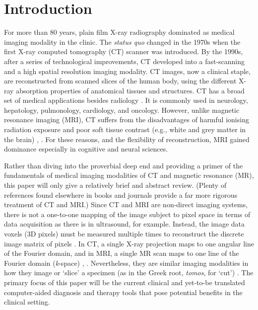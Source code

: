 \documentclass{bmcart}
\begin{document}
\section*{Introduction}
For more than 80 years, plain film X-ray radiography dominated as medical imaging modality in the clinic. The \textit{status quo} changed in the 1970s when the first X-ray computed tomography (CT) scanner was introduced. By the 1990s, after a series of technological improvements, CT developed into a fast-scanning and a high spatial resolution imaging modality. CT images, now a clinical staple, are reconstructed from scanned slices of the human body, using the different X-ray absorption properties of anatomical tissues and structures. CT has a broad set of medical applications besides radiology \cite{rubin_computed_2014}. It is commonly used in neurology, hepatology, pulmonology, cardiology, and oncology. However, unlike magnetic resonance imaging (MRI), CT suffers from the disadvantages of harmful ionising radiation exposure and poor soft tissue contrast (e.g., white and grey matter in the brain) \cite{ward_mri:_2015}, \cite{radue_introduction_2016}. For these reasons, and the flexibility of reconstruction, MRI gained dominance especially in cognitive and neural sciences.
\par Rather than diving into the proverbial deep end and providing a primer of the fundamentals of medical imaging modalities of CT and magnetic resonance (MR), this paper will only give a relatively brief and abstract review. (Plenty of references found elsewhere in books and journals provide a far more rigorous treatment of CT and MRI.) Since CT and MRI are non-direct imaging systems, there is not a one-to-one mapping of the image subject to pixel space in terms of data acquisition as there is in ultrasound, for example. Instead, the image data voxels (3D pixels) must be measured multiple times to reconstruct the discrete image matrix of pixels \cite{adam_grainger_2015}. In CT, a single X-ray projection maps to one angular line of the Fourier domain, and in MRI, a single MR scan maps to one line of the Fourier domain (\textit{k}-space) \cite{farncombe_medical_2014}, \cite{plewes_physics_2014}. Nevertheless, they are similar imaging modalities in how they image or `slice' a specimen (as in the Greek root, \textit{tomos}, for `cut') \cite{liang_principles_2000}. The primary focus of this paper will be the current clinical and yet-to-be translated computer-aided diagnosis and therapy tools that pose potential benefits in the clinical setting. 
\end{document}
